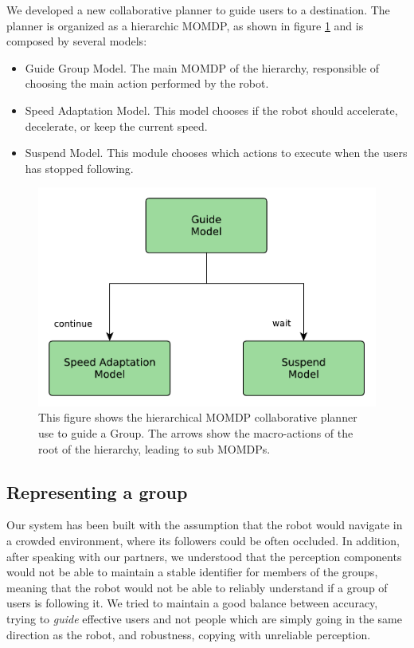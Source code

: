 We developed a new collaborative planner to guide users to a destination. The planner is organized as a hierarchic MOMDP, as shown in figure \ref{fig:case_study-spencer-guide_planner} and is composed by several models:
\begin{itemize}
\item Guide Group Model. The main MOMDP of the hierarchy, responsible of choosing the main action performed by the robot.
\item Speed Adaptation Model. This model chooses if the robot should accelerate, decelerate, or keep the current speed.
\item Suspend Model. This module chooses which actions to execute when the users has stopped following. 
\end{itemize}



\begin{figure}[ht!]
	\centering
	\includegraphics[scale=0.45]{img/case_study/spencer/guide_planner.pdf}
	\caption[Collaborative planner for guiding]{This figure shows the hierarchical MOMDP collaborative planner use to guide a Group. The arrows show the macro-actions of the root of the hierarchy, leading to sub MOMDPs.}
	\label{fig:case_study-spencer-guide_planner}
\end{figure}

\subsection{Representing a group}
\label{subsec:spencer-group}
Our system has been built with the assumption that the robot would navigate in a crowded environment, where its followers could be often occluded. In addition, after speaking with our partners, we understood that the perception components would not be able to maintain a stable identifier for members of the groups, meaning that the robot would not be able to reliably understand if a group of users is following it. We tried to maintain a good balance between accuracy, trying to \textit{guide} effective users and not people which are simply going in the same direction as the robot, and robustness, copying with unreliable perception.



